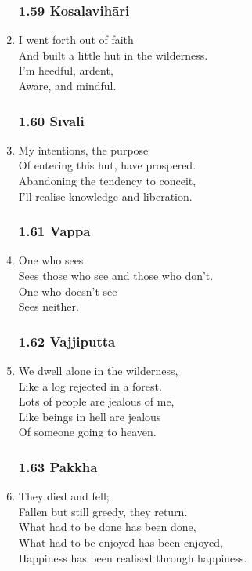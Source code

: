 \documentclass[10pt, openany]{book}
\begin{document}
\begin{enumerate}
\subsubsection*{1.59 Kosalavihāri}

\item I went forth out of faith\\
And built a little hut in the wilderness.\\
I’m heedful, ardent, \\
Aware, and mindful.

\subsubsection*{1.60 Sīvali}

\item My intentions, the purpose \\
Of entering this hut, have prospered.\\
Abandoning the tendency to conceit,\\
I’ll realise knowledge and liberation.

\subsubsection*{1.61 Vappa}

\item One who sees\\
Sees those who see and those who don’t.\\
One who doesn’t see\\
Sees neither.

\subsubsection*{1.62 Vajjiputta}

\item We dwell alone in the wilderness,\\
Like a log rejected in a forest.\\
Lots of people are jealous of me,\\
Like beings in hell are jealous \\
Of someone going to heaven.

\subsubsection*{1.63 Pakkha}

\item They died and fell;\\
Fallen but still greedy, they return.\\
What had to be done has been done,\\
What had to be enjoyed has been enjoyed,\\
Happiness has been realised through happiness.


\end{enumerate}
\end{document}
